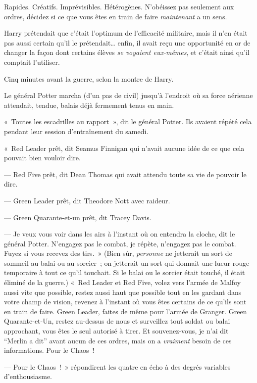 Rapides. Créatifs. Imprévisibles. Hétérogènes. N'obéissez pas seulement aux ordres, décidez si ce que vous êtes en train de faire \emph{maintenant} a un sens.

Harry prétendait que c'était l'optimum de l'efficacité militaire, mais il n'en était pas aussi certain qu'il le prétendait… enfin, il avait reçu une opportunité en or de changer la façon dont certains élèves \emph{se voyaient eux-mêmes}, et c'était ainsi qu'il comptait l'utiliser.

Cinq minutes avant la guerre, selon la montre de Harry.

Le général Potter marcha (d'un pas de civil) jusqu'à l'endroit où sa force aérienne attendait, tendue, balais déjà fermement tenus en main.

«~Toutes les escadrilles au rapport~», dit le général Potter. Ils avaient répété cela pendant leur session d'entraînement du samedi.

«~Red Leader prêt, dit Seamus Finnigan qui n'avait aucune idée de ce que cela pouvait bien vouloir dire.

--- Red Five prêt, dit Dean Thomas qui avait attendu toute sa vie de pouvoir le dire.

--- Green Leader prêt, dit Theodore Nott avec raideur.

--- Green Quarante-et-un prêt, dit Tracey Davis.

--- Je veux vous voir dans les airs à l'instant où on entendra la cloche, dit le général Potter. N'engagez pas le combat, je répète, n'engagez pas le combat. Fuyez si vous recevez des tirs.~» (Bien sûr, \emph{personne} ne jetterait un sort de sommeil au balai ou au sorcier~; on jetterait un sort qui donnait une lueur rouge temporaire à tout ce qu'il touchait. Si le balai ou le sorcier était touché, il était éliminé de la guerre.) «~Red Leader et Red Five, volez vers l'armée de Malfoy aussi vite que possible, restez aussi haut que possible tout en les gardant dans votre champ de vision, revenez à l'instant où vous êtes certains de ce qu'ils sont en train de faire. Green Leader, faites de même pour l'armée de Granger. Green Quarante-et-Un, restez au-dessus de nous et surveillez tout soldat ou balai approchant, vous êtes le seul autorisé à tirer. Et souvenez-vous, je n'ai dit “Merlin a dit” avant aucun de ces ordres, mais on a \emph{vraiment} besoin de ces informations. Pour le Chaos~!

--- Pour le Chaos~!~» répondirent les quatre en écho à des degrés variables d'enthousiasme.

